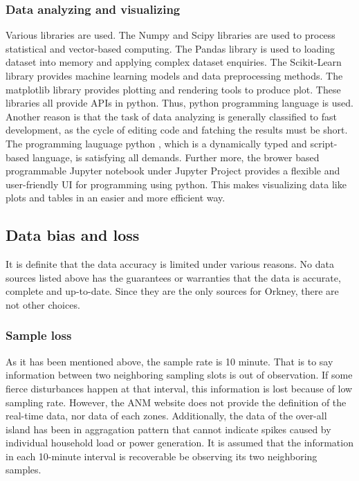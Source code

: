 \documentclass[12pt,a4paper]{report}
\begin{document}
                \subsubsection{Data analyzing and visualizing}
                Various libraries are used. The Numpy and Scipy libraries \cite{website:numpy} \cite{website:scipy} are used to process statistical and vector-based computing. The Pandas library \cite{website:pandas} is used
                to loading dataset into memory and applying complex dataset enquiries. The Scikit-Learn library \cite{website:scikit} provides machine learning models and data preprocessing methods. The matplotlib library
                \cite{website:matplotlib} provides plotting and rendering tools to produce plot. These libraries all provide APIs in python. Thus, python programming language \cite{website:python3} is used. Another reason is that
                the task of data analyzing is generally classified to fast development, as the cycle of editing code and fatching the results must be short. The programming lauguage python \cite{website:python3}, which is a
                dynamically typed and script-based language, is satisfying all demands. Further more, the brower based programmable Jupyter notebook under Jupyter Project \cite{website:jupyter} provides a flexible and user-friendly
                UI for programming using python. This makes visualizing data like plots and tables in an easier and more efficient way.
                
        \subsection{Data bias and loss}
        It is definite that the data accuracy is limited under various reasons. No data sources listed above has the guarantees or warranties that the data is accurate, complete and up-to-date. 
        Since they are the only sources for Orkney, there are not other choices.

                \subsubsection{Sample loss}
                As it has been mentioned above, the sample rate is 10 minute. That is to say information between two neighboring sampling slots is out of observation.
                If some fierce disturbances happen at that interval, this information is lost because of low sampling rate. However, the ANM website does not provide
                the definition of the real-time data, nor data of each zones. Additionally, the data of the over-all island has been in aggragation pattern that cannot
                indicate spikes caused by individual household load or power generation. It is assumed that the information in each 10-minute interval is recoverable be
                observing its two neighboring samples.
\end{document}

